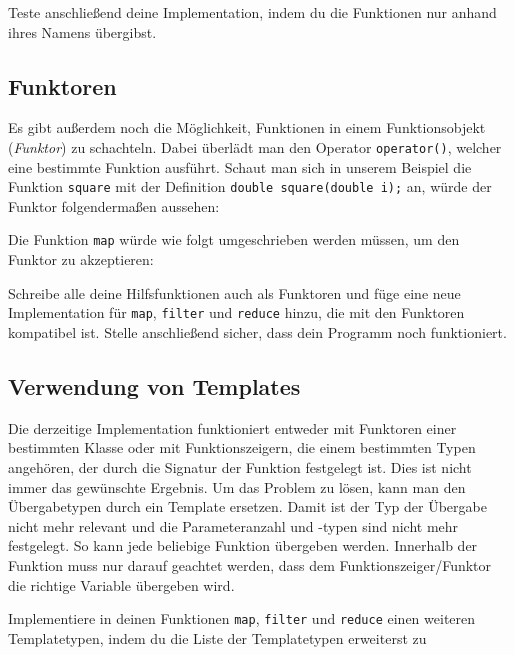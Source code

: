 Teste anschließend deine Implementation, indem du die Funktionen nur anhand ihres Namens übergibst.

\subsection{Funktoren}
\label{sec:functional_functor}
Es gibt außerdem noch die Möglichkeit, Funktionen in einem Funktionsobjekt (\emph{Funktor}) zu schachteln.
Dabei überlädt man den Operator \lstinline{operator()}, welcher eine bestimmte Funktion ausführt. 
Schaut man sich in unserem Beispiel die Funktion \lstinline{square} mit der Definition \lstinline{double square(double i);} an, würde der Funktor folgendermaßen aussehen:


Die Funktion \lstinline{map} würde wie folgt umgeschrieben werden müssen, um den Funktor zu akzeptieren:


Schreibe alle deine Hilfsfunktionen auch als Funktoren und füge eine neue Implementation für \lstinline{map}, \lstinline{filter} und \lstinline{reduce} hinzu, die mit den Funktoren kompatibel ist.
Stelle anschließend sicher, dass dein Programm noch funktioniert.

\subsection{Verwendung von Templates}
\label{sec:functional_template}
Die derzeitige Implementation funktioniert entweder mit Funktoren einer bestimmten Klasse oder mit Funktionszeigern, die einem bestimmten Typen angehören, der durch die Signatur der Funktion festgelegt ist.
Dies ist nicht immer das gewünschte Ergebnis.
Um das Problem zu lösen, kann man den Übergabetypen durch ein Template ersetzen.
Damit ist der Typ der Übergabe nicht mehr relevant und die Parameteranzahl und -typen sind nicht mehr festgelegt. So kann jede beliebige Funktion übergeben werden.
Innerhalb der Funktion muss nur darauf geachtet werden, dass dem Funktionszeiger/Funktor die richtige Variable übergeben wird.

Implementiere in deinen Funktionen \lstinline{map}, \lstinline{filter} und \lstinline{reduce} einen weiteren Templatetypen, indem du die Liste der Templatetypen erweiterst zu 


